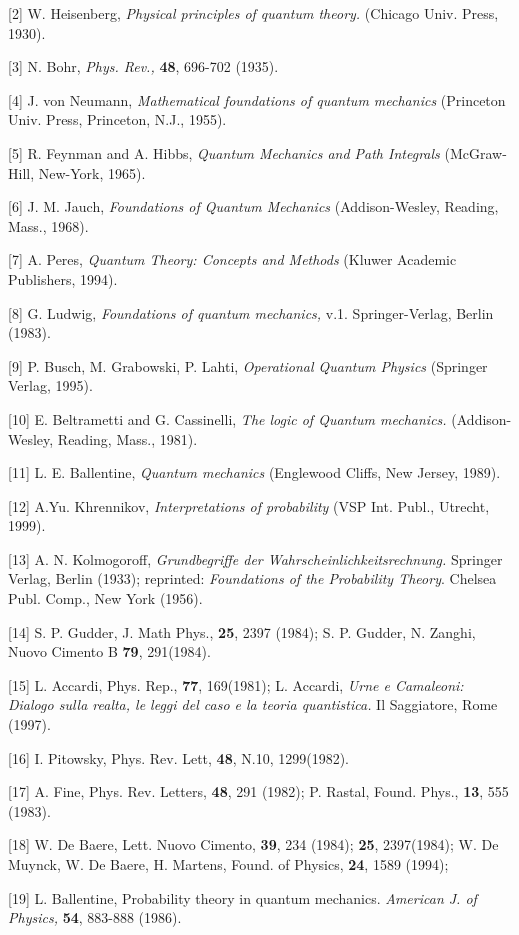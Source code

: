 \documentclass[12pt,oneside,final,a4paper]{article}
\begin{document}
[2] W. Heisenberg, {\it Physical principles of quantum theory.}
(Chicago Univ. Press, 1930).

[3]  N. Bohr, {\it Phys. Rev.,} {\bf 48}, 696-702 (1935).

[4] J. von Neumann, {\it Mathematical foundations
of quantum mechanics} (Princeton Univ. Press, Princeton, N.J., 1955).

[5] R. Feynman and A. Hibbs, {\it Quantum Mechanics and Path Integrals}
(McGraw-Hill, New-York, 1965).

[6] J. M. Jauch, {\it Foundations of Quantum Mechanics} (Addison-Wesley,
Reading, Mass., 1968).

[7] A. Peres, {\em Quantum Theory: Concepts and Methods} (Kluwer Academic
Publishers, 1994).


[8]  G. Ludwig, {\it Foundations of quantum mechanics,} v.1. Springer-Verlag, Berlin
(1983).

[9] P. Busch, M. Grabowski, P. Lahti, {\it Operational Quantum Physics}
(Springer Verlag, 1995).

[10] E. Beltrametti  and G. Cassinelli, {\it The logic of Quantum mechanics.}
(Addison-Wesley, Reading, Mass., 1981).

[11]  L. E. Ballentine, {\it Quantum mechanics} (Englewood Cliffs, 
New Jersey, 1989).

[12] A.Yu. Khrennikov, {\it Interpretations of 
probability} (VSP Int. Publ., Utrecht, 1999).

[13] A. N. Kolmogoroff, {\it Grundbegriffe der Wahrscheinlichkeitsrechnung.}
Springer Verlag, Berlin (1933); reprinted:
{\it Foundations of the Probability Theory}. 
Chelsea Publ. Comp., New York (1956).

[14] S. P. Gudder,  J. Math Phys., {\bf 25}, 2397 (1984); S. P. Gudder, N.
Zanghi, Nuovo Cimento B {\bf 79}, 291(1984).

[15] L. Accardi, Phys. Rep., {\bf 77}, 169(1981); 
L. Accardi, {\it Urne e Camaleoni: Dialogo sulla realta,
le leggi del caso e la teoria quantistica.} Il Saggiatore, Rome (1997).

[16] I. Pitowsky,  Phys. Rev. Lett, {\bf 48}, N.10, 1299(1982).
 
[17]  A. Fine,  Phys. Rev. Letters, {\bf 48}, 291 (1982);
P. Rastal, Found. Phys., {\bf 13}, 555 (1983).

[18] W. De Baere,  Lett. Nuovo Cimento, {\bf 39}, 234 (1984);
{\bf 25}, 2397(1984); 
 W. De Muynck, W. De Baere, H. Martens,
 Found. of Physics, {\bf 24}, 1589 (1994);

[19] L. Ballentine, Probability theory in quantum mechanics. {\it American
J. of Physics,} {\bf 54}, 883-888 (1986).
\end{document}
